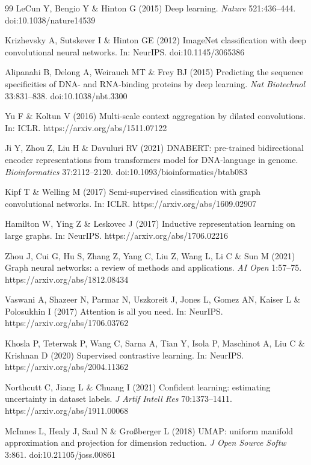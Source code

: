\documentclass[12pt]{article}
\begin{document}
\begin{singlespacing}
\begin{thebibliography}{99}
LeCun Y, Bengio Y \& Hinton G (2015) Deep learning. \textit{Nature} 521:436--444. doi:10.1038/nature14539

Krizhevsky A, Sutskever I \& Hinton GE (2012) ImageNet classification with deep convolutional neural networks. In: NeurIPS. doi:10.1145/3065386

Alipanahi B, Delong A, Weirauch MT \& Frey BJ (2015) Predicting the sequence specificities of DNA- and RNA-binding proteins by deep learning. \textit{Nat Biotechnol} 33:831--838. doi:10.1038/nbt.3300

Yu F \& Koltun V (2016) Multi-scale context aggregation by dilated convolutions. In: ICLR. https://arxiv.org/abs/1511.07122

Ji Y, Zhou Z, Liu H \& Davuluri RV (2021) DNABERT: pre-trained bidirectional encoder representations from transformers model for DNA-language in genome. \textit{Bioinformatics} 37:2112--2120. doi:10.1093/bioinformatics/btab083

Kipf T \& Welling M (2017) Semi-supervised classification with graph convolutional networks. In: ICLR. https://arxiv.org/abs/1609.02907

Hamilton W, Ying Z \& Leskovec J (2017) Inductive representation learning on large graphs. In: NeurIPS. https://arxiv.org/abs/1706.02216

Zhou J, Cui G, Hu S, Zhang Z, Yang C, Liu Z, Wang L, Li C \& Sun M (2021) Graph neural networks: a review of methods and applications. \textit{AI Open} 1:57--75. https://arxiv.org/abs/1812.08434

Vaswani A, Shazeer N, Parmar N, Uszkoreit J, Jones L, Gomez AN, Kaiser L \& Polosukhin I (2017) Attention is all you need. In: NeurIPS. https://arxiv.org/abs/1706.03762

Khosla P, Teterwak P, Wang C, Sarna A, Tian Y, Isola P, Maschinot A, Liu C \& Krishnan D (2020) Supervised contrastive learning. In: NeurIPS. https://arxiv.org/abs/2004.11362

Northcutt C, Jiang L \& Chuang I (2021) Confident learning: estimating uncertainty in dataset labels. \textit{J Artif Intell Res} 70:1373--1411. https://arxiv.org/abs/1911.00068

McInnes L, Healy J, Saul N \& Gro{\ss}berger L (2018) UMAP: uniform manifold approximation and projection for dimension reduction. \textit{J Open Source Softw} 3:861. doi:10.21105/joss.00861


\end{thebibliography}
\end{singlespacing}
\end{document}
